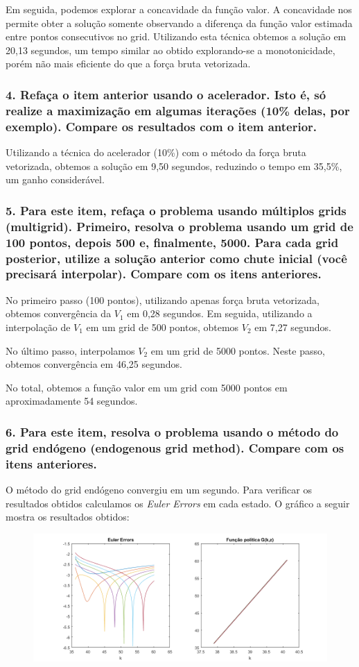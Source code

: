 \documentclass{article}
\begin{document}
Em seguida, podemos explorar a concavidade da função valor. A concavidade nos
permite obter a solução somente observando a diferença da função valor
estimada entre pontos  consecutivos no grid. Utilizando esta técnica obtemos a
solução em 20,13 segundos, um tempo similar ao obtido explorando-se a
monotonicidade, porém não mais eficiente do que a força bruta vetorizada.

\subsubsection*{4. Refaça o item anterior usando o acelerador. Isto é, só
realize a maximização em algumas iterações (10\% delas, por exemplo). Compare
os resultados com o item anterior.}

Utilizando a técnica do acelerador (10\%) com o método da força bruta
vetorizada, obtemos a solução em 9,50 segundos, reduzindo o tempo em 35,5\%,
um ganho considerável.

\subsubsection*{5. Para este item, refaça o problema usando múltiplos grids
(multigrid). Primeiro, resolva o problema usando um grid de 100 pontos, depois
500 e, finalmente, 5000. Para cada grid posterior, utilize a solução anterior
como chute inicial (você precisará interpolar). Compare com os itens
anteriores.}

No primeiro passo (100 pontos), utilizando apenas força bruta vetorizada,
obtemos convergência da $V_1$ em 0,28 segundos. Em seguida, utilizando a
interpolação de $V_1$ em um grid de 500 pontos,  obtemos $V_2$ em 7,27
segundos.

No último passo, interpolamos $V_2$ em um grid de 5000 pontos. Neste passo,
obtemos convergência em 46,25 segundos.

No total, obtemos a função valor em um grid com 5000 pontos em aproximadamente
54 segundos.

\subsubsection*{6. Para este item, resolva o problema usando o método do grid endógeno
(endogenous grid method). Compare com os itens anteriores.}

O método do grid endógeno convergiu em um segundo. Para verificar os resultados
obtidos calculamos os \textit{Euler Errors} em cada estado. O gráfico a
seguir mostra os resultados obtidos:


\begin{figure}[h!]
  \includegraphics[width=\linewidth]{graf2.png}
\end{figure}
\end{document}
